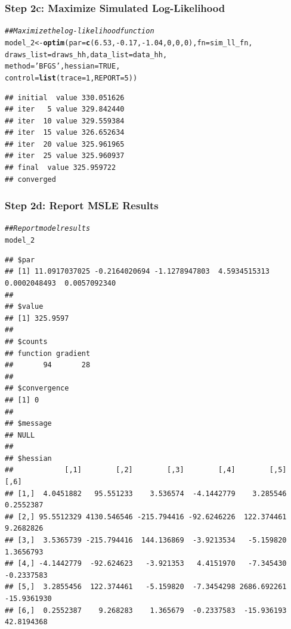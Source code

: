 \documentclass{beamer}\usepackage[]{graphicx}\usepackage[]{color}
\makeatletter
\newcommand{\hlnum}[1]{\textcolor[rgb]{0.686,0.059,0.569}{#1}}%
\newcommand{\hlstr}[1]{\textcolor[rgb]{0.192,0.494,0.8}{#1}}%
\newcommand{\hlcom}[1]{\textcolor[rgb]{0.678,0.584,0.686}{\textit{#1}}}%
\newcommand{\hlopt}[1]{\textcolor[rgb]{0,0,0}{#1}}%
\newcommand{\hlstd}[1]{\textcolor[rgb]{0.345,0.345,0.345}{#1}}%
\newcommand{\hlkwb}[1]{\textcolor[rgb]{0.69,0.353,0.396}{#1}}%
\newcommand{\hlkwc}[1]{\textcolor[rgb]{0.333,0.667,0.333}{#1}}%
\newcommand{\hlkwd}[1]{\textcolor[rgb]{0.737,0.353,0.396}{\textbf{#1}}}%
\newenvironment{kframe}{%
 \def\at@end@of@kframe{}%
 \ifinner\ifhmode%
  \def\at@end@of@kframe{\end{minipage}}%
  \begin{minipage}{\columnwidth}%
 \fi\fi%
 \def\FrameCommand##1{\hskip\@totalleftmargin \hskip-\fboxsep
 \colorbox{shadecolor}{##1}\hskip-\fboxsep
     \hskip-\linewidth \hskip-\@totalleftmargin \hskip\columnwidth}%
 \MakeFramed {\advance\hsize-\width
   \@totalleftmargin\z@ \linewidth\hsize
   \@setminipage}}%
 {\par\unskip\endMakeFramed%
 \at@end@of@kframe}
\newenvironment{knitrout}{}{} %
\makeatother
\begin{document}
\begin{frame}[fragile]\frametitle{Step 2c: Maximize Simulated Log-Likelihood}
\begin{knitrout}\footnotesize
{}\color{fgcolor}\begin{kframe}
\begin{alltt}
\hlcom{## Maximize the log-likelihood function}
\hlstd{model_2} \hlkwb{<-} \hlkwd{optim}\hlstd{(}\hlkwc{par} \hlstd{=} \hlkwd{c}\hlstd{(}\hlnum{6.53}\hlstd{,} \hlopt{-}\hlnum{0.17}\hlstd{,} \hlopt{-}\hlnum{1.04}\hlstd{,} \hlnum{0}\hlstd{,} \hlnum{0}\hlstd{,} \hlnum{0}\hlstd{),} \hlkwc{fn} \hlstd{= sim_ll_fn,}
                 \hlkwc{draws_list} \hlstd{= draws_hh,} \hlkwc{data_list} \hlstd{= data_hh,}
                 \hlkwc{method} \hlstd{=} \hlstr{'BFGS'}\hlstd{,} \hlkwc{hessian} \hlstd{=} \hlnum{TRUE}\hlstd{,}
                 \hlkwc{control} \hlstd{=} \hlkwd{list}\hlstd{(}\hlkwc{trace} \hlstd{=} \hlnum{1}\hlstd{,} \hlkwc{REPORT} \hlstd{=} \hlnum{5}\hlstd{))}
\end{alltt}
\begin{verbatim}
## initial  value 330.051626 
## iter   5 value 329.842440
## iter  10 value 329.559384
## iter  15 value 326.652634
## iter  20 value 325.961965
## iter  25 value 325.960937
## final  value 325.959722 
## converged
\end{verbatim}
\end{kframe}
\end{knitrout}
\end{frame}

\begin{frame}[fragile]\frametitle{Step 2d: Report MSLE Results}
    
\begin{knitrout}\tiny
{}\color{fgcolor}\begin{kframe}
\begin{alltt}
\hlcom{## Report model results}
\hlstd{model_2}
\end{alltt}
\begin{verbatim}
## $par
## [1] 11.0917037025 -0.2164020694 -1.1278947803  4.5934515313  0.0002048493  0.0057092340
## 
## $value
## [1] 325.9597
## 
## $counts
## function gradient 
##       94       28 
## 
## $convergence
## [1] 0
## 
## $message
## NULL
## 
## $hessian
##            [,1]        [,2]        [,3]        [,4]        [,5]        [,6]
## [1,]  4.0451882   95.551233    3.536574  -4.1442779    3.285546   0.2552387
## [2,] 95.5512329 4130.546546 -215.794416 -92.6246226  122.374461   9.2682826
## [3,]  3.5365739 -215.794416  144.136869  -3.9213534   -5.159820   1.3656793
## [4,] -4.1442779  -92.624623   -3.921353   4.4151970   -7.345430  -0.2337583
## [5,]  3.2855456  122.374461   -5.159820  -7.3454298 2686.692261 -15.9361930
## [6,]  0.2552387    9.268283    1.365679  -0.2337583  -15.936193  42.8194368
\end{verbatim}
\end{kframe}
\end{knitrout}
\end{frame}
\end{document}
